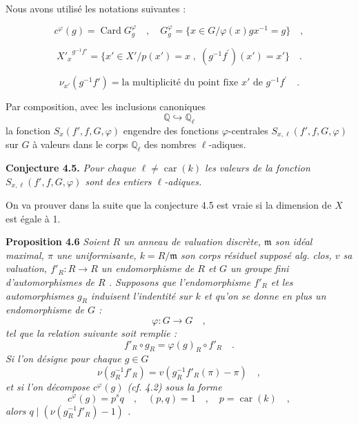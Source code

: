 \documentclass[11pt]{article}
\providecommand{\fm}{\mathfrak{m}}
\newcommand{\car}{\operatorname{car}}
\providecommand{\car}{\operatorname{car}}
\providecommand{\car}{\operatorname{car}}
\providecommand{\bQ}{\mathbb Q}
\providecommand{\fm}{\mathfrak m}
\providecommand{\car}{\operatorname{car}}
\begin{document}
Nous avons utilisé les notations suivantes :

\begin{equation}\tag{4.2}
c^\varphi(g) = \operatorname{Card} G_g^\varphi \quad , \quad G_g^\varphi = \{ x \in G / \varphi(x)gx^{-1} = g \} \quad ,
\end{equation}

\begin{equation}\tag{4.3}
{X'_x}^{g^{-1}f'} = \{ x' \in X' / p(x') = x \; , \; (g^{-1}f^{\prime})(x') = x' \} \quad .
\end{equation}

\begin{equation}\tag{4.4}
\nu_{x'}(g^{-1}f') = \text{la multiplicité du point fixe } x' \text{ de } g^{-1}f^{\prime} \quad .
\end{equation}

Par composition, avec les inclusions canoniques
\[
\bQ \hookrightarrow \bQ_\ell
\]
la
fonction $S_x(f',f,G,\varphi)$ engendre des fonctions $\varphi$-centrales $S_{x,\ell}(f',f,G,\varphi)$ sur $G$ à valeurs dans le corps $\bQ_\ell$ des nombres $\ell$-adiques.

\medskip
\noindent
\textbf{Conjecture 4.5.} \emph{Pour chaque $\ell \neq \car(k)$ les valeurs de la fonction $S_{x,\ell}(f',f,G,\varphi)$ sont des entiers $\ell$-adiques.}

\medskip

On va prouver dans la suite que la conjecture 4.5 est vraie si la dimension de $X$ est égale à 1.

\medskip
\noindent
\textbf{Proposition 4.6} \emph{Soient $R$ un anneau de valuation discrète, $\fm$ son idéal maximal, $\pi$ une uniformisante, $k = R/\fm$ son corps résiduel supposé alg. clos, $v$ sa valuation, $f'_R : R \to R$ un endomorphisme de $R$ et $G$ un groupe fini d'automorphismes de $R$ . Supposons que l'endomorphisme $f'_R$ et les automorphismes $g_R$ induisent l'indentité sur $k$ et qu'on se donne en plus un endomorphisme de $G$ :
\[
\varphi : G \longrightarrow G \quad ,
\]
tel que la relation suivante soit remplie :
\[
f'_R \circ g_R = \varphi(g)_R \circ f'_R \quad .
\]
Si l'on désigne pour chaque $g \in G$
\[
\nu(g_R^{-1}f'_R) = v(g_R^{-1}f'_R(\pi) - \pi) \quad ,
\]
et si l'on décompose $c^\varphi(g)$ (cf. 4.2) sous la forme
\[
c^\varphi(g) = p^s q \quad , \quad (p,q) = 1 \quad , \quad p = \car(k) \quad ,
\]
alors $q \mid (\nu(g_R^{-1}f'_R) - 1)$ .}
\end{document}
